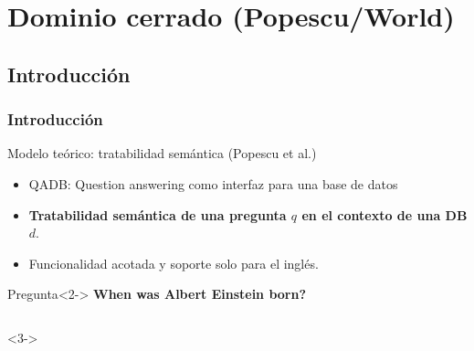 
\section{Dominio cerrado (Popescu/World)}
\subsection{Introducción}

\begin{frame}
  \frametitle{Introducción}\fontsize{8.0pt}{8.0}\selectfont
  \begin{block}{Modelo teórico: tratabilidad semántica (Popescu et al.)}
    \begin{itemize}
          \item QADB: Question answering como interfaz para una base de datos
          \item \textbf{Tratabilidad semántica de una pregunta $q$ en el contexto de una DB $d$}.
          \item Funcionalidad acotada y soporte solo para el inglés.
    \end{itemize}
  \end{block}

  \begin{block}{Pregunta}<2->
      \textbf{When was Albert Einstein born?}
  \end{block}
  \begin{columns}<3->
      \begin{column}{.5\textwidth}
      \end{column}
      \begin{column}{.1\textwidth}
      \end{column}
      \begin{column}{.3\textwidth}
      \end{column}
      \begin{column}{.5\textwidth}

      \end{column}
  \end{columns}


\end{frame}

